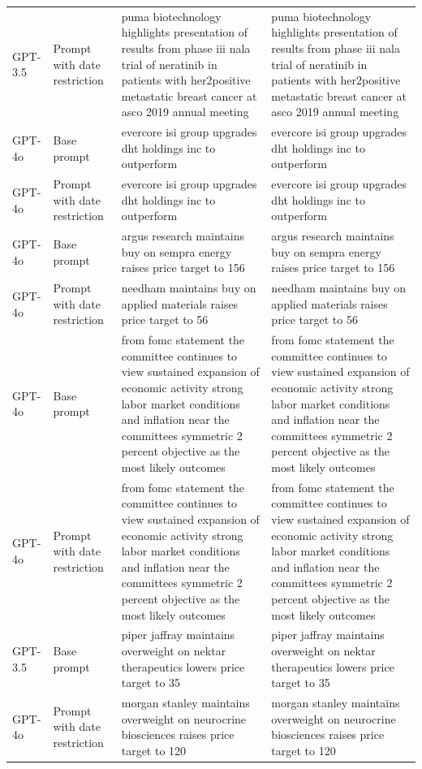 \begin{longtable}{>{\raggedright\arraybackslash}p{1.4cm}>{\raggedright\arraybackslash}p{1.4cm}>{\raggedright\arraybackslash}p{5.5cm}>{\raggedright\arraybackslash}p{5.5cm}}
GPT-3.5 & Prompt with date restriction & puma biotechnology highlights presentation of results from phase iii nala trial of neratinib in patients with her2positive metastatic breast cancer at asco 2019 annual meeting & puma biotechnology highlights presentation of results from phase iii nala trial of neratinib in patients with her2positive metastatic breast cancer at asco 2019 annual meeting\\
GPT-4o & Base prompt & evercore isi group upgrades dht holdings inc to outperform & evercore isi group upgrades dht holdings inc to outperform\\
GPT-4o & Prompt with date restriction & evercore isi group upgrades dht holdings inc to outperform & evercore isi group upgrades dht holdings inc to outperform\\
GPT-4o & Base prompt & argus research maintains buy on sempra energy raises price target to 156 & argus research maintains buy on sempra energy raises price target to 156\\
GPT-4o & Prompt with date restriction & needham maintains buy on applied materials raises price target to 56 & needham maintains buy on applied materials raises price target to 56\\
GPT-4o & Base prompt & from fomc statement the committee continues to view sustained expansion of economic activity strong labor market conditions and inflation near the committees symmetric 2 percent objective as the most likely outcomes & from fomc statement the committee continues to view sustained expansion of economic activity strong labor market conditions and inflation near the committees symmetric 2 percent objective as the most likely outcomes\\
GPT-4o & Prompt with date restriction & from fomc statement the committee continues to view sustained expansion of economic activity strong labor market conditions and inflation near the committees symmetric 2 percent objective as the most likely outcomes & from fomc statement the committee continues to view sustained expansion of economic activity strong labor market conditions and inflation near the committees symmetric 2 percent objective as the most likely outcomes\\
GPT-3.5 & Base prompt & piper jaffray maintains overweight on nektar therapeutics lowers price target to 35 & piper jaffray maintains overweight on nektar therapeutics lowers price target to 35\\
GPT-4o & Prompt with date restriction & morgan stanley maintains overweight on neurocrine biosciences raises price target to 120 & morgan stanley maintains overweight on neurocrine biosciences raises price target to 120\\

\end{longtable}
